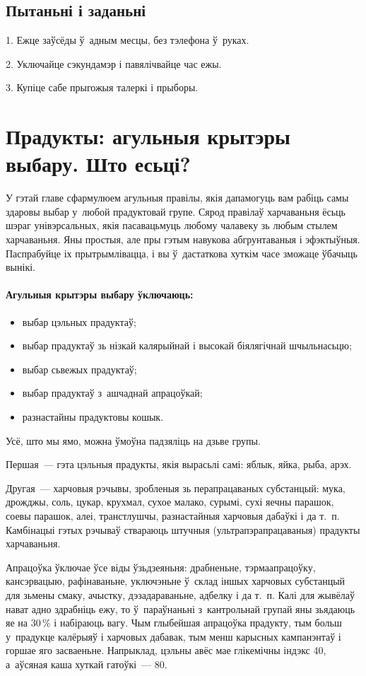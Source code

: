 \subsection*{Пытаньні і заданьні}

1. Ежце заўсёды ў~адным месцы, без тэлефона ў~руках.

2. Уключайце сэкундамэр і павялічвайце час ежы.

3. Купіце сабе прыгожыя талеркі і прыборы.


\section{Прадукты: агульныя крытэры выбару. Што есьці?}

У гэтай главе сфармулюем агульныя правілы, якія дапамогуць вам рабіць самы здаровы выбар у~любой прадуктовай групе. Сярод правілаў харчаваньня ёсьць шэраг унівэрсальных, якія пасавацьмуць любому чалавеку зь любым стылем харчаваньня. Яны простыя, але пры гэтым навукова абгрунтаваныя і эфэктыўныя. Паспрабуйце іх прытрымлівацца, і вы ў~дастаткова хуткім часе зможаце ўбачыць вынікі.

\paragraph{Агульныя крытэры выбару ўключаюць:}
\begin{itemize}
  \item выбар цэльных прадуктаў;
  \item выбар прадуктаў зь нізкай калярыйнай і высокай біялягічнай шчыльнасьцю;
  \item выбар сьвежых прадуктаў;
  \item выбар прадуктаў з~ашчаднай апрацоўкай;
  \item разнастайны прадуктовы кошык.
\end{itemize}

Усё, што мы ямо, можна ўмоўна падзяліць на дзьве групы.

Першая~--- гэта цэльныя прадукты, якія вырасьлі самі: яблык, яйка, рыба, арэх.

Другая~--- харчовыя рэчывы, зробленыя зь перапрацаваных субстанцый: мука, дрожджы, соль, цукар, крухмал, сухое малако, сурымі, сухі яечны парашок, соевы парашок, алеі, транстлушчы, разнастайныя харчовыя дабаўкі і да т.~п. Камбінацыі гэтых рэчываў ствараюць штучныя (ультрапэрапрацаваныя) прадукты харчаваньня.

Апрацоўка ўключае ўсе віды ўзьдзеяньня: драбненьне, тэрмаапрацоўку, кансэрвацыю, рафінаваньне, уключэньне ў~склад іншых харчовых субстанцый для зьмены смаку, ачыстку, дэзадараваньне, адбелку і да т.~п. Калі для жывёлаў нават адно здрабніць ежу, то ў~параўнаньні з~кантрольнай групай яны зьядаюць яе на 30\,\% і набіраюць вагу. Чым глыбейшая апрацоўка прадукту, тым больш у~прадукце калёрыяў і харчовых дабавак, тым менш карысных кампанэнтаў і горшае яго засваеньне. Напрыклад, цэльны авёс мае глікемічны індэкс 40, а~аўсяная каша хуткай гатоўкі~--- 80.

